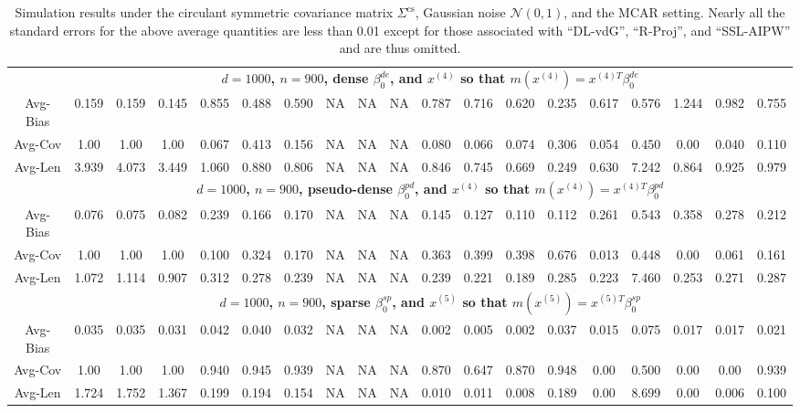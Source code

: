 \documentclass[ejsv2,noshowframe]{imsart}
\theoremstyle{plain}
\theoremstyle{definition}
\theoremstyle{remark}
\begin{document}
\begin{table}[hbtp!]
\begin{center}
{\begin{tabular}{ccccccccccccccccccc}
		& \multicolumn{18}{c}{\bf $d=1000$, $n = 900$, dense $\beta_0^{de}$, and $x^{(4)}$ so that $m(x^{(4)})=x^{(4)T}\beta_0^{de}$} \\ \cline{2-19}
		Avg-Bias & 0.159 & 0.159 & 0.145 & 0.855 & 0.488 & 0.590 & NA & NA & NA & 0.787 & 0.716 & 0.620 & 0.235 & 0.617 & 0.576 & 1.244 & 0.982 & 0.755 \\
		Avg-Cov & 1.00 & 1.00 & 1.00 & 0.067 & 0.413 & 0.156 & NA & NA & NA & 0.080 & 0.066 & 0.074 & 0.306 & 0.054 & 0.450 & 0.00 & 0.040 & 0.110 \\
		Avg-Len & 3.939 & 4.073 & 3.449 & 1.060 & 0.880 & 0.806 & NA & NA & NA & 0.846 & 0.745 & 0.669 & 0.249 & 0.630 & 7.242 & 0.864 & 0.925 & 0.979 \\
		\cline{2-19}
		
		& \multicolumn{18}{c}{\bf $d=1000$, $n = 900$, pseudo-dense $\beta_0^{pd}$, and $x^{(4)}$ so that $m(x^{(4)})=x^{(4)T}\beta_0^{pd}$} \\ \cline{2-19}
		Avg-Bias & 0.076 & 0.075 & 0.082 & 0.239 & 0.166 & 0.170 & NA & NA & NA & 0.145 & 0.127 & 0.110 & 0.112 & 0.261 & 0.543 & 0.358 & 0.278 & 0.212 \\
		Avg-Cov & 1.00 & 1.00 & 1.00 & 0.100 & 0.324 & 0.170 & NA & NA & NA & 0.363 & 0.399 & 0.398 & 0.676 & 0.013 & 0.448 & 0.00 & 0.061 & 0.161 \\
		Avg-Len & 1.072 & 1.114 & 0.907 & 0.312 & 0.278 & 0.239 & NA & NA & NA & 0.239 & 0.221 & 0.189 & 0.285 & 0.223 & 7.460 & 0.253 & 0.271 & 0.287 \\
		\hline
		
		& \multicolumn{18}{c}{\bf $d=1000$, $n = 900$, sparse $\beta_0^{sp}$, and $x^{(5)}$ so that $m(x^{(5)})=x^{(5)T}\beta_0^{sp}$} \\ \cline{2-19}
		Avg-Bias & 0.035 & 0.035 & 0.031 & 0.042 & 0.040 & 0.032 & NA & NA & NA & 0.002 & 0.005 & 0.002 & 0.037 & 0.015 & 0.075 & 0.017 & 0.017 & 0.021 \\
		Avg-Cov & 1.00 & 1.00 & 1.00 & 0.940 & 0.945 & 0.939 & NA & NA & NA & 0.870 & 0.647 & 0.870 & 0.948 & 0.00 & 0.500 & 0.00 & 0.00 & 0.939 \\
		Avg-Len & 1.724 & 1.752 & 1.367 & 0.199 & 0.194 & 0.154 & NA & NA & NA & 0.010 & 0.011 & 0.008 & 0.189 & 0.00 & 8.699 & 0.00 & 0.006 & 0.100 \\
		\hline\hline
\end{tabular}}
\caption{Simulation results under the circulant symmetric covariance matrix $\Sigma^{\mathrm{cs}}$, Gaussian noise $\mathcal{N}(0,1)$, and the MCAR setting. Nearly all the standard errors for the above average quantities are less than 0.01 except for those associated with ``DL-vdG'', ``R-Proj'', and ``SSL-AIPW'' and are thus omitted.}
\label{table:cirsym_MCAR_res}
\end{center}
\end{table}
\end{document}
